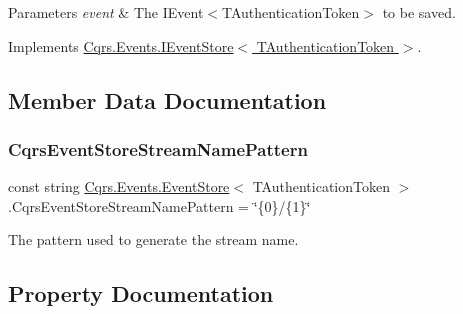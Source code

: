 \begin{DoxyParams}{Parameters}
{\em event} & The I\+Event$<$\+T\+Authentication\+Token$>$ to be saved.\\
\hline
\end{DoxyParams}


Implements \hyperlink{interfaceCqrs_1_1Events_1_1IEventStore_a92e768243d6602d09b786bbd06811ce6_a92e768243d6602d09b786bbd06811ce6}{Cqrs.\+Events.\+I\+Event\+Store$<$ T\+Authentication\+Token $>$}.



\subsection{Member Data Documentation}
\mbox{\label{classCqrs_1_1Events_1_1EventStore_a1e6d87995d38d6fbb148388ec165a87e_a1e6d87995d38d6fbb148388ec165a87e}} 
\subsubsection{\texorpdfstring{Cqrs\+Event\+Store\+Stream\+Name\+Pattern}{CqrsEventStoreStreamNamePattern}}
{\footnotesize\ttfamily const string \hyperlink{classCqrs_1_1Events_1_1EventStore}{Cqrs.\+Events.\+Event\+Store}$<$ T\+Authentication\+Token $>$.Cqrs\+Event\+Store\+Stream\+Name\+Pattern = \char`\"{}\{0\}/\{1\}\char`\"{}\hspace{0.3cm}{\ttfamily [protected]}}



The pattern used to generate the stream name. 



\subsection{Property Documentation}
\mbox{\label{classCqrs_1_1Events_1_1EventStore_a05393aedf2eae4b2eeae3977e7f1c6f9_a05393aedf2eae4b2eeae3977e7f1c6f9}} 

